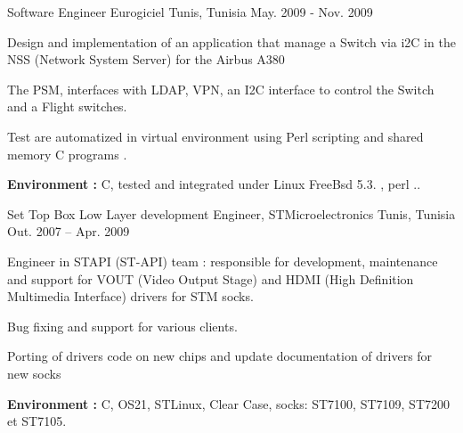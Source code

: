 \documentclass[11pt, a4paper]{awesome-cv} %
\begin{document}
\begin{cventries}
    \cventry
    {Software Engineer} %
    {Eurogiciel} %
    {Tunis, Tunisia} %
    {May. 2009 - Nov. 2009} %
    { %
        \begin{cvitems}
            \item {Design and implementation of an application that manage a Switch via i2C in the NSS (Network System Server) for the Airbus A380}
            \item {The PSM, interfaces with LDAP, VPN, an I2C interface to control the Switch and a  Flight switches.}
            \item {Test are automatized in virtual environment using Perl scripting and shared memory C programs . }
            \item { \textbf{Environment :} C, tested and integrated under Linux FreeBsd 5.3. , perl ..}
        \end{cvitems}
    }


    \cventry
    {Set Top Box Low Layer development Engineer,} %
    {STMicroelectronics} %
    {Tunis, Tunisia } %
    {Out. 2007 – Apr. 2009} %
    { %
        \begin{cvitems}
            \item {Engineer in STAPI (ST-API)  team : responsible for development, maintenance and support for VOUT (Video Output Stage) and HDMI (High Definition Multimedia Interface) drivers for STM socks.}
            \item {Bug fixing  and support  for various clients. }
            \item {Porting of drivers code on new chips and update documentation of drivers for new socks }
            \item { \textbf{Environment :} C, OS21, STLinux, Clear Case, socks: ST7100, ST7109, ST7200 et ST7105. }
        \end{cvitems}
    }


    \clearpage
\end{cventries}
\end{document}
